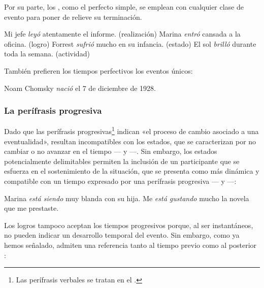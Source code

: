 Por su parte, los , como el perfecto simple, se
emplean con cualquier clase de evento para poner de relieve su terminación.

\begin{exe}
  \ex Mi jefe \textit{leyó} atentamente el informe. (realización)
  \ex Marina \textit{entró} cansada a la oficina. (logro)
  \ex Forrest \textit{sufrió} mucho en su infancia. (estado)
  \ex El sol \textit{brilló} durante toda la semana. (actividad)
\end{exe}

También prefieren los tiempos perfectivos los eventos únicos:

\begin{exe}
  \ex Noam Chomsky \textit{nació} el 7 de diciembre de 1928.
\end{exe}

\subsubsection{La perífrasis progresiva}\label{sec:08-progresiva}

Dado que las perífrasis progresivas\footnote{Las perífrasis verbales se tratan
en el .} indican «el proceso de cambio asociado a una eventualidad»,
resultan incompatibles con los estados, que se caracterizan por no cambiar o no
avanzar en el tiempo \parencite[301]{bosque2009} --- y
---. Sin embargo, los estados potencialmente delimitables
permiten la inclusión de un participante que se esfuerza en el sostenimiento de
la situación, que se presenta como más dinámica y compatible con un tiempo
expresado por una perífrasis progresiva --- y
---:

\begin{exe}
  \ex\label{ex:08-blanda} Marina \textit{está siendo} muy blanda con su hija.
  \ex\label{ex:08-gustando} Me \textit{está gustando} mucho la novela que me
      prestaste.
\end{exe}

Los logros tampoco aceptan los tiempos progresivos porque, al ser instantáneos,
no pueden indicar un desarrollo temporal del evento. Sin embargo, como ya hemos
señalado, admiten una referencia tanto al tiempo previo 
como al posterior :

